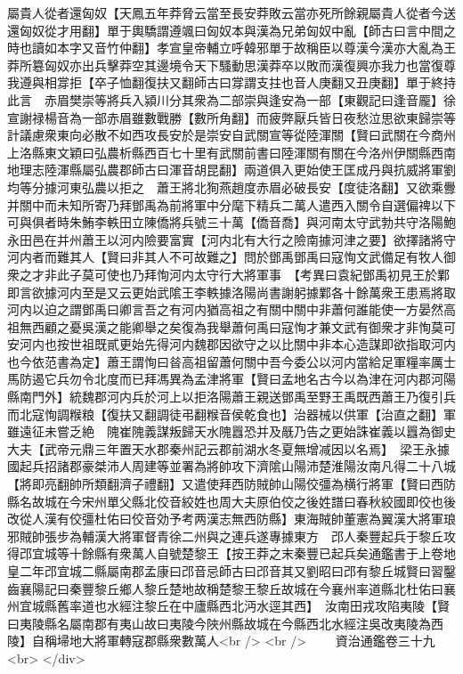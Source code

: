 屬貴人從者還匈奴【天鳳五年莽脅云當至長安莽敗云當亦死所餘親屬貴人從者今送還匈奴從才用翻】單于輿驕謂遵颯曰匈奴本與漢為兄弟匈奴中亂【師古曰言中間之時也讀如本字又音竹仲翻】孝宣皇帝輔立呼韓邪單于故稱臣以尊漢今漢亦大亂為王莽所簒匈奴亦出兵擊莽空其邊境令天下騷動思漢莽卒以敗而漢復興亦我力也當復尊我遵與相牚拒【卒子恤翻復扶又翻師古曰牚謂支拄也音人庚翻又丑庚翻】單于終持此言　赤眉樊崇等將兵入潁川分其衆為二部崇與逢安為一部【東觀記曰逢音龎】徐宣謝禄楊音為一部赤眉雖數戰勝【數所角翻】而疲弊厭兵皆日夜愁泣思欲東歸崇等計議慮衆東向必散不如西攻長安於是崇安自武關宣等從陸渾關【賢曰武關在今商州上洛縣東文穎曰弘農析縣西百七十里有武關前書曰陸渾關有關在今洛州伊關縣西南地理志陸渾縣屬弘農郡師古曰渾音胡昆翻】兩道俱入更始使王匡成丹與抗威將軍劉均等分據河東弘農以拒之　蕭王將北狥燕趙度赤眉必破長安【度徒洛翻】又欲乘釁并關中而未知所寄乃拜鄧禹為前將軍中分麾下精兵二萬人遣西入關令自選偏禆以下可與俱者時朱鮪李軼田立陳僑將兵號三十萬【僑音喬】與河南太守武勃共守洛陽鮑永田邑在并州蕭王以河内險要富實【河内北有大行之險南據河津之要】欲擇諸將守河内者而難其人【賢曰非其人不可故難之】問於鄧禹鄧禹曰寇恂文武備足有牧人御衆之才非此子莫可使也乃拜恂河内太守行大將軍事　【考異曰袁紀鄧禹初見王於鄴即言欲據河内至是又云更始武隂王李軼據洛陽尚書謝躬據鄴各十餘萬衆王患焉將取河内以迫之謂鄧禹曰卿言吾之有河内猶高祖之有關中關中非蕭何誰能使一方晏然高祖無西顧之憂吳漢之能卿舉之矣復為我舉蕭何禹曰寇恂才兼文武有御衆才非恂莫可安河内也按世祖既貳更始先得河内魏郡因欲守之以比關中非本心造謀即欲指取河内也今依范書為定】蕭王謂恂曰㫺高祖留蕭何關中吾今委公以河内當給足軍糧率厲士馬防遏它兵勿令北度而已拜馮異為孟津將軍【賢曰孟地名古今以為津在河内郡河陽縣南門外】統魏郡河内兵於河上以拒洛陽蕭王親送鄧禹至野王禹既西蕭王乃復引兵而北寇恂調糇粮【復扶又翻調徒弔翻糇音侯乾食也】治器械以供軍【治直之翻】軍雖遠征未嘗乏絶　隗崔隗義謀叛歸天水隗囂恐并及旤乃告之更始誅崔義以囂為御史大夫【武帝元鼎三年置天水郡秦州記云郡前湖水冬夏無增减因以名焉】　梁王永據國起兵招諸郡豪桀沛人周建等並署為將帥攻下濟隂山陽沛楚淮陽汝南凡得二十八城【將即亮翻帥所類翻濟子禮翻】又遣使拜西防賊帥山陽佼彊為横行將軍【賢曰西防縣名故城在今宋州單父縣北佼音絞姓也周大夫原伯佼之後姓譜曰春秋絞國即佼也後改從人漢有佼彊杜佑曰佼音効予考两漢志無西防縣】東海賊帥董憲為翼漢大將軍琅邪賊帥張步為輔漢大將軍督青徐二州與之連兵遂專據東方　邔人秦豐起兵于黎丘攻得邔宜城等十餘縣有衆萬人自號楚黎王【按王莽之末秦豐已起兵矣通鑑書于上卷地皇二年邔宜城二縣屬南郡孟康曰邔音忌師古曰邔音其又劉昭曰邔有黎丘城賢曰習鑿齒襄陽記曰秦豐黎丘鄉人黎丘楚地故稱楚黎王黎丘故城在今襄州率道縣北杜佑曰襄州宜城縣舊率道也水經注黎丘在中廬縣西北沔水逕其西】　汝南田戎攻陷夷陵【賢曰夷陵縣名屬南郡有夷山故曰夷陵今陜州縣故城在今縣西北水經注吳改夷陵為西陵】自稱埽地大將軍轉寇郡縣衆數萬人<br />
<br />
　　資治通鑑卷三十九  <br>
   </div> 


